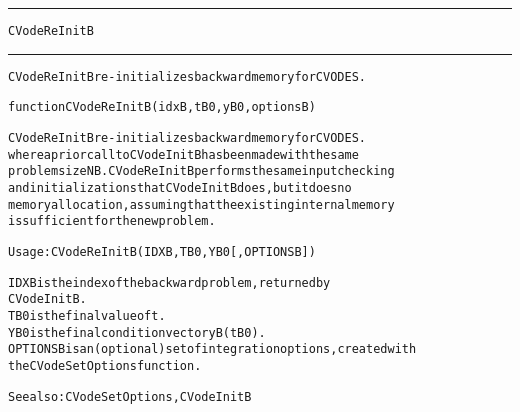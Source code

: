 \begin{samepage}
\hrule
\begin{center}
{\large \verb!CVodeReInitB!}
\label{p:CVodeReInitB}
\end{center}
\hrule\vspace{0.1in}



\begin{alltt}
CVodeReInitB re-initializes backward memory for CVODES.
\end{alltt}

\end{samepage}



\begin{samepage}


\begin{alltt}
function CVodeReInitB(idxB, tB0, yB0, optionsB) 
\end{alltt}

\end{samepage}



\begin{alltt}
CVodeReInitB re-initializes backward memory for CVODES.
   where a prior call to CVodeInitB has been made with the same
   problem size NB. CVodeReInitB performs the same input checking
   and initializations that CVodeInitB does, but it does no 
   memory allocation, assuming that the existing internal memory 
   is sufficient for the new problem.

   Usage:   CVodeReInitB ( IDXB, TB0, YB0 [, OPTIONSB] )

   IDXB     is the index of the backward problem, returned by
            CVodeInitB.
   TB0      is the final value of t.
   YB0      is the final condition vector yB(tB0).  
   OPTIONSB is an (optional) set of integration options, created with
            the CVodeSetOptions function. 

   See also: CVodeSetOptions, CVodeInitB
\end{alltt}






\vspace{0.1in}